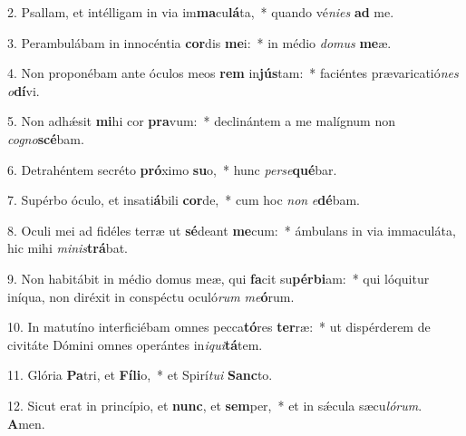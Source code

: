 2. Psallam, et intélligam in via im\textbf{ma}cu\textbf{lá}ta,~*  quando vé\textit{ni}\textit{es} \textbf{ad} me.\

3. Perambulábam in innocéntia \textbf{cor}dis \textbf{me}i:~*  in médio \textit{do}\textit{mus} \textbf{me}æ.\

4. Non proponébam ante óculos meos \textbf{rem} in\textbf{jús}tam:~*  faciéntes prævaricatió\textit{nes} \textit{o}\textbf{dí}vi.\

5. Non adhǽsit \textbf{mi}hi cor \textbf{pra}vum:~*  declinántem a me malígnum non \textit{co}\textit{gno}\textbf{scé}bam.\

6. Detrahéntem secréto \textbf{pró}ximo \textbf{su}o,~*  hunc \textit{per}\textit{se}\textbf{qué}bar.\

7. Supérbo óculo, et insati\textbf{á}bili \textbf{cor}de,~*  cum hoc \textit{non} \textit{e}\textbf{dé}bam.\

8. Oculi mei ad fidéles terræ ut \textbf{sé}deant \textbf{me}cum:~*  ámbulans in via immaculáta, hic mihi \textit{mi}\textit{nis}\textbf{trá}bat.\

9. Non habitábit in médio domus meæ, qui \textbf{fa}cit su\textbf{pér}\textbf{bi}am:~*  qui lóquitur iníqua, non diréxit in conspéctu oculó\textit{rum} \textit{me}\textbf{ó}rum.\

10. In matutíno interficiébam omnes pecca\textbf{tó}res \textbf{ter}ræ:~*  ut dispérderem de civitáte Dómini omnes operántes in\textit{i}\textit{qui}\textbf{tá}tem.\

11. Glória \textbf{Pa}tri, et \textbf{Fí}\textbf{li}o,~*  et Spirí\textit{tu}\textit{i} \textbf{Sanc}to.\

12. Sicut erat in princípio, et \textbf{nunc}, et \textbf{sem}per,~*  et in sǽcula sæcu\textit{ló}\textit{rum}. \textbf{A}men.\

